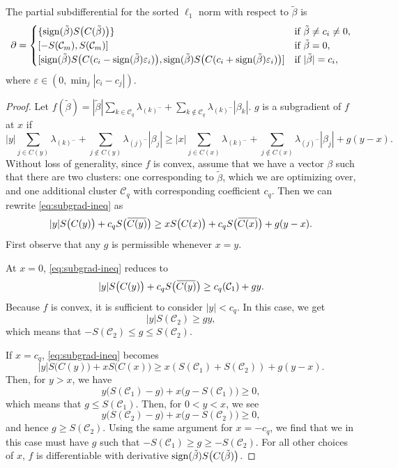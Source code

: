 \begin{theorem}
  \label{thm:cluster-subdifferential}
  The partial subdifferential for the sorted \(\ell_1\) norm with respect
  to \(\tilde\beta\) is
  \[
    \partial =
    \begin{cases}
      \{\sign(\tilde\beta) S\big(C(\tilde\beta)\big)\}                    & \text{if } \tilde\beta \neq c_i \neq 0, \\
      [-S(\mathcal{C}_m), S(\mathcal{C}_m)]                               & \text{if } \tilde\beta = 0,             \\
      [\sign(\tilde\beta)S\big( C(c_i - \sign(\tilde\beta)\varepsilon_i)\big), \sign(\tilde\beta)S\big(C(c_i + \sign(\tilde\beta)\varepsilon_i)\big)] & \text{if } |\tilde\beta| = c_i,
    \end{cases}
  \]
  where \(\varepsilon \in (0, \min_{j}|c_i - c_j|)\).
\end{theorem}
\begin{proof}
  Let \(f(\tilde\beta) = |\tilde\beta|\sum_{k \in \mathcal{C}_q}\lambda_{(k)^-} + \sum_{k \notin \mathcal{C}_q} \lambda_{(k)^-}|\beta_k|\).
  \(g\) is a subgradient of \(f\) at \(x\) if
  \begin{equation}
    \label{eq:subgrad-ineq}
    |y|\sum_{j \in C(y)}\lambda_{(k)^-} + \sum_{j \notin C(y)}\lambda_{(j)^-}|\beta_j| 
    \geq |x|\sum_{j \in C(x)} \lambda_{(k)^-} + \sum_{j \notin C(x)}\lambda_{(j)^-}|\beta_j| + g(y - x).
  \end{equation}
  Without loss of generality, since \(f\) is convex, assume that we have
  a vector \(\beta\) such that there are two clusters: one corresponding
  to \(\tilde\beta\), which we are optimizing over, and
  one additional cluster \(\mathcal{C}_q\) with corresponding
  coefficient \(c_q\). Then we can rewrite \eqref{eq:subgrad-ineq} as
  \[
    |y|S\big(C(y)\big) + c_q S\big(\widebar{C(y)}\big) \geq
    x S\big(C(x)\big) + c_q S\big(\widebar{C(x)}\big) + g(y - x).
  \]
  First observe that any \(g\) is permissible whenever \(x = y\).

  At \(x = 0\), \eqref{eq:subgrad-ineq} reduces to
  \[
    |y|S\big(C(y)\big) + c_q S\big(\widebar{C(y)}\big)
    \geq c_q(\mathcal{C}_1) + gy.
  \]
  Because \(f\) is convex, it is sufficient to consider \(|y| < c_q\).
  In this case, we get
  \[
    |y|S(\mathcal{C}_2) \geq gy,
  \]
  which means that \(-S(\mathcal{C}_2) \leq g \leq S(\mathcal{C}_2)\).

  If \(x = c_q\), \eqref{eq:subgrad-ineq} becomes
  \[
    |y|S\big(C(y)\big) + x S\big(C(x)\big) \geq x(S(\mathcal{C}_1) + S(\mathcal{C}_2)) + g(y - x).
  \]
  Then, for \(y > x\), we have
  \[
    y\big(S(\mathcal{C}_1) - g\big) + x\big(g - S(\mathcal{C}_1)\big) \geq 0,
  \]
  which means that \(g \leq S(\mathcal{C}_1)\).
  Then, for \(0 < y < x\), we see
  \[
    y\big(S(\mathcal{C}_2) - g\big) + x(g - S(\mathcal{C}_2)\big) \geq 0,
  \]
  and hence \(g \geq S(\mathcal{C}_2)\).
  Using the same argument for \(x = -c_q\), we find that we in this case
  must have \(g\) such that 
  \(-S(\mathcal{C}_1) \geq g \geq - S(\mathcal{C}_2)\).
  For all other choices of \(x\), \(f\) is differentiable with
  derivative \(\operatorname{sign}(\tilde\beta)S\big(C(\tilde\beta)\big)\).
\end{proof}

